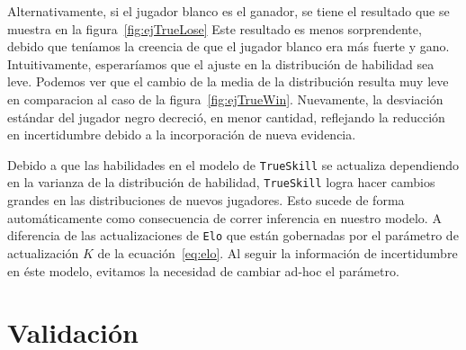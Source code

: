 \documentclass[11pt,twoside, spanish]{report} %
\begin{document}
Alternativamente, si el jugador blanco es el ganador, se tiene el resultado que se muestra en la figura~\ref{fig:ejTrueLose}
Este resultado es menos sorprendente, debido que ten\'iamos la creencia de que el jugador blanco era m\'as fuerte y gano.
Intuitivamente, esperar\'iamos que el ajuste en la distribuci\'on de habilidad sea leve.
Podemos ver que el cambio de la media de la distribuci\'on resulta muy leve en comparacion al caso de la figura~\ref{fig:ejTrueWin}.
Nuevamente, la desviaci\'on est\'andar del jugador negro decreci\'o, en menor cantidad, reflejando la reducci\'on en incertidumbre debido a la incorporaci\'on de nueva evidencia.

Debido a que las habilidades en el modelo de \texttt{TrueSkill} se actualiza dependiendo en la varianza de la distribuci\'on de habilidad, \texttt{TrueSkill} logra hacer cambios grandes en las distribuciones de nuevos jugadores.
Esto sucede de forma autom\'aticamente como consecuencia de correr inferencia en nuestro modelo.
A diferencia de las actualizaciones de \texttt{Elo} que est\'an gobernadas por el par\'ametro de actualizaci\'on $K$ de la ecuaci\'on~\ref{eq:elo}.
Al seguir la informaci\'on de incertidumbre en \'este modelo, evitamos la necesidad de cambiar ad-hoc el par\'ametro.








\chapter{Validaci\'on}
%
\end{document}

